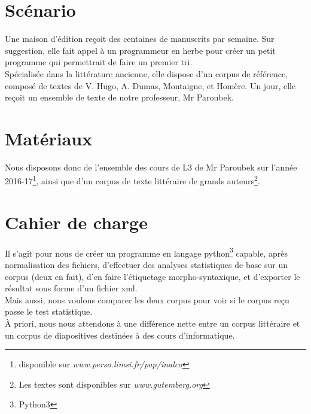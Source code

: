 \section{Scénario} 

Une maison d'édition reçoit des centaines de manuscrits par semaine. Sur suggestion, elle fait appel à un programmeur en herbe pour créer un petit programme qui permettrait de faire un premier tri. \\

Spécialisée dans la littérature ancienne, elle dispose d'un corpus de référence, composé de textes de V. Hugo, A. Dumas, Montaigne, et Homère. Un jour, elle reçoit un ensemble de texte de notre professeur, Mr Paroubek. \\

\section{Matériaux}

Nous disposons donc de l'ensemble des cours de L3 de Mr Paroubek sur l'année 2016-17\footnote{disponible sur \emph{www.perso.limsi.fr/pap/inalco}}, ainsi que d'un corpus de texte littéraire de grands auteurs\footnote{Les textes sont disponibles sur \emph{www.gutemberg.org}}. \\

\section{Cahier de charge}

Il s'agit pour nous de créer un programme en langage python\footnote{Python3} capable, après normalisation des fichiers, d'effectuer des analyses statistiques de base sur un corpus (deux en fait), d'en faire l'étiquetage morpho-syntaxique, et d'exporter le résultat sous forme d'un fichier xml. \\

Mais aussi, nous voulons comparer les deux corpus pour voir si le corpus reçu passe le test statistique. \\

À priori, nous nous attendons à une différence nette entre un corpus littéraire et un corpus de diapositives destinées à des cours d'informatique. \\





